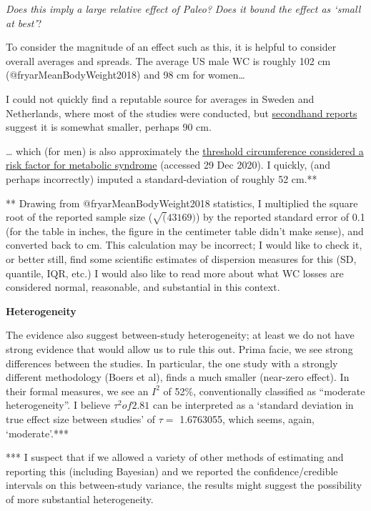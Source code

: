 \documentclass[]{article}
\begin{document}
\hfill\break

\emph{Does this imply a large relative effect of Paleo?} \emph{Does it
bound the effect as `small at best'}?

To consider the magnitude of an effect such as this, it is helpful to
consider overall averages and spreads. The average US male WC is roughly
102 cm (@fryarMeanBodyWeight2018) and 98 cm for women\ldots*

I could not quickly find a reputable source for averages in Sweden and
Netherlands, where most of the studies were conducted, but
\href{https://www.dailymail.co.uk/health/article-2441250/Average-BMI-Artist-compares-sizes-men-various-countries.html}{secondhand
reports} suggest it is somewhat smaller, perhaps 90 cm.

\ldots{} which (for men) is also approximately the
\href{https://www.heart.org/en/health-topics/metabolic-syndrome/about-metabolic-syndrome}{threshold
circumference considered a risk factor for metabolic syndrome} (accessed
29 Dec 2020). I quickly, (and perhaps incorrectly) imputed a
standard-deviation of roughly 52 cm.**

** Drawing from @fryarMeanBodyWeight2018 statistics, I multiplied the
square root of the reported sample size (\(\sqrt(43169 )\)) by the
reported standard error of 0.1 (for the table in inches, the figure in
the centimeter table didn't make sense), and converted back to cm. This
calculation may be incorrect; I would like to check it, or better still,
find some scientific estimates of dispersion measures for this (SD,
quantile, IQR, etc.) I would also like to read more about what WC losses
are considered normal, reasonable, and substantial in this context.

\hfill\break

\textbf{Heterogeneity}

The evidence also suggest between-study heterogeneity; at least we do
not have strong evidence that would allow us to rule this out. Prima
facie, we see strong differences between the studies. In particular, the
one study with a strongly different methodology (Boers et al), finds a
much smaller (near-zero effect). In their formal measures, we see an
\(I^2\) of 52\%, conventionally classified as ``moderate
heterogeneity''. I believe \(\tau^2 of 2.81\) can be interpreted as a
`standard deviation in true effect size between studies' of \(\tau =\)
1.6763055, which seems, again, `moderate'.***

*** I suspect that if we allowed a variety of other methods of
estimating and reporting this (including Bayesian) and we reported the
confidence/credible intervals on this between-study variance, the
results might suggest the possibility of more substantial heterogeneity.
\end{document}
